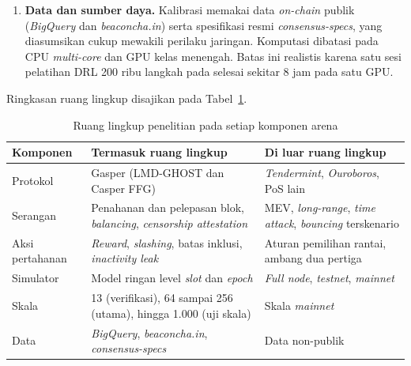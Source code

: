 \begin{enumerate}
	\item \textbf{Data dan sumber daya.} Kalibrasi memakai data \textit{on-chain} publik (\textit{BigQuery} dan \textit{beaconcha.in}) serta spesifikasi resmi \textit{consensus-specs}, yang diasumsikan cukup mewakili perilaku jaringan. Komputasi dibatasi pada CPU \textit{multi-core} dan GPU kelas menengah. Batas ini realistis karena satu sesi pelatihan DRL 200 ribu langkah pada \textcite{skowronski2026adaptive} selesai sekitar 8 jam pada satu GPU.
\end{enumerate}

Ringkasan ruang lingkup disajikan pada Tabel~\ref{tab:scope_summary}.

\begin{table}[htbp]
\centering
\caption{Ruang lingkup penelitian pada setiap komponen arena}
\label{tab:scope_summary}
\small
\begin{tabular}{|p{2.7cm}|p{5.6cm}|p{5.2cm}|}
\hline
\textbf{Komponen} & \textbf{Termasuk ruang lingkup} & \textbf{Di luar ruang lingkup} \\
\hline
Protokol & Gasper (LMD-GHOST dan Casper FFG) & \textit{Tendermint}, \textit{Ouroboros}, PoS lain \\
\hline
Serangan & Penahanan dan pelepasan blok, \textit{balancing}, \textit{censorship attestation} & MEV, \textit{long-range}, \textit{time attack}, \textit{bouncing} terskenario \\
\hline
Aksi pertahanan & \textit{Reward}, \textit{slashing}, batas inklusi, \textit{inactivity leak} & Aturan pemilihan rantai, ambang dua pertiga \\
\hline
Simulator & Model ringan level \textit{slot} dan \textit{epoch} & \textit{Full node}, \textit{testnet}, \textit{mainnet} \\
\hline
Skala & 13 (verifikasi), 64 sampai 256 (utama), hingga 1.000 (uji skala) & Skala \textit{mainnet} \\
\hline
Data & \textit{BigQuery}, \textit{beaconcha.in}, \textit{consensus-specs} & Data non-publik \\
\hline
\end{tabular}
\end{table}

